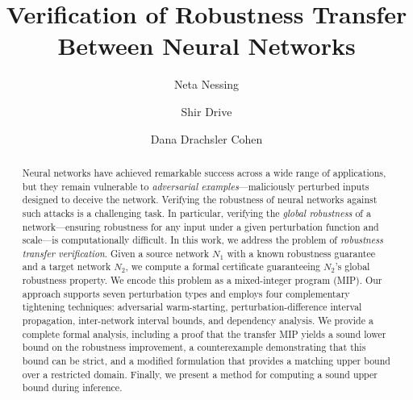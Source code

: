 \documentclass[runningheads]{llncs}
\begin{document}
\title{Verification of Robustness Transfer Between Neural Networks}

\author{Neta Nessing \and Shir Drive \and Dana Drachsler Cohen}


\maketitle

\begin{abstract}
Neural networks have achieved remarkable success across a wide range of applications, but they remain vulnerable to \emph{adversarial examples}---maliciously perturbed inputs designed to deceive the network. Verifying the robustness of neural networks against such attacks is a challenging task. In particular, verifying the \emph{global robustness} of a network---ensuring robustness for any input under a given perturbation function and scale---is computationally difficult.
In this work, we address the problem of \emph{robustness transfer verification}. Given a source network $N_1$ with a known robustness guarantee and a target network $N_2$, we compute a formal certificate guaranteeing $N_2$'s global robustness property. We encode this problem as a mixed-integer program (MIP).
Our approach supports seven perturbation types and employs four complementary tightening techniques: adversarial warm-starting, perturbation-difference interval propagation, inter-network interval bounds, and dependency analysis. We provide a complete formal analysis, including a proof that the transfer MIP yields a sound lower bound on the robustness improvement, a counterexample demonstrating that this bound can be strict, and a modified formulation that provides a matching upper bound over a restricted domain. Finally, we present a method for computing a sound upper bound during inference.

\end{abstract}

\linenumbers












\end{document}
